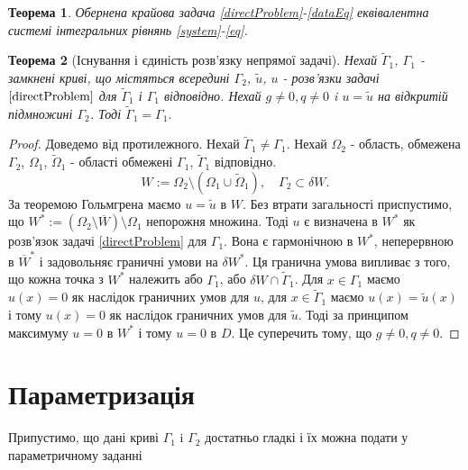 \documentclass[12pt]{article}
\newtheorem{theorem}{Теорема}
\begin{document}
\begin{theorem}
Обернена крайова задача \eqref{directProblem}-\eqref{dataEq} еквівалентна системі інтегральних рівнянь \eqref{system}-\eqref{eq}.
\end{theorem}

\begin{theorem}[Існування і єдиність розв'язку непрямої задачі]

Нехай $\tilde{\Gamma}_1$, $\Gamma_1$ - замкнені криві, що містяться всередині $\Gamma_2$, $\tilde{u}$, $u$ - розв'язки задачі $\eqref{directProblem}$ для $\tilde{\Gamma}_1$ і $\Gamma_1$ відповідно. Нехай $g\neq 0, q\neq 0$ i $u = \tilde{u}$ на відкритій підмножині $\Gamma_2$. Тоді $\tilde{\Gamma}_1=\Gamma_1$.

\end{theorem}

\begin{proof}

Доведемо від протилежного. Нехай $\tilde{\Gamma}_1\neq\Gamma_1$.
Нехай $\Omega_2$ - область, обмежена $\Gamma_2$, $\Omega_1$, $\tilde{\Omega}_1$ - області обмежені $\Gamma_1$, $\tilde{\Gamma}_1$ відповідно. 
\begin{equation}
W:=\Omega_2\setminus(\Omega_1\cup\tilde{\Omega}_1), \quad \Gamma_2\subset\delta W. \nonumber
\end{equation}
За теоремою Гольмгрена маємо $u = \tilde{u}$ в $W$. Без втрати загальності приспустимо, що $W^{*}:=(\Omega_2\setminus \overline{W})\setminus\Omega_1$ непорожня множина. Тоді $u$ є визначена в $W^{*}$ як розв'язок задачі \eqref{directProblem} для $\Gamma_1$. Вона є гармонічною в $W^{*}$, неперервною в $\overline{W}^{*}$ і задовольняє граничні умови на $\delta W^{*}$. Ця гранична умова випливає з того, що кожна точка з $W^{*}$ належить або $\Gamma_1$, або $\delta W\cap\tilde{\Gamma}_1$. Для $x\in\Gamma_1$ маємо $u(x)=0$ як наслідок граничних умов для $u$, для $x\in\tilde{\Gamma}_1$ маємо $u(x)=\tilde{u}(x)$ і тому $u(x)=0$ як наслідок граничних умов для $\tilde{u}$. Тоді за принципом максимуму $u=0$ в $W^{*}$ і тому $u=0$ в $D$. Це суперечить тому, що $g\neq 0, q\neq 0$.
\end{proof}


\section {Параметризація}

Припустимо, що дані криві $\Gamma_1$ i $\Gamma_2$ достатньо гладкі і їх можна подати у параметричному заданні 
 
\end{document}
